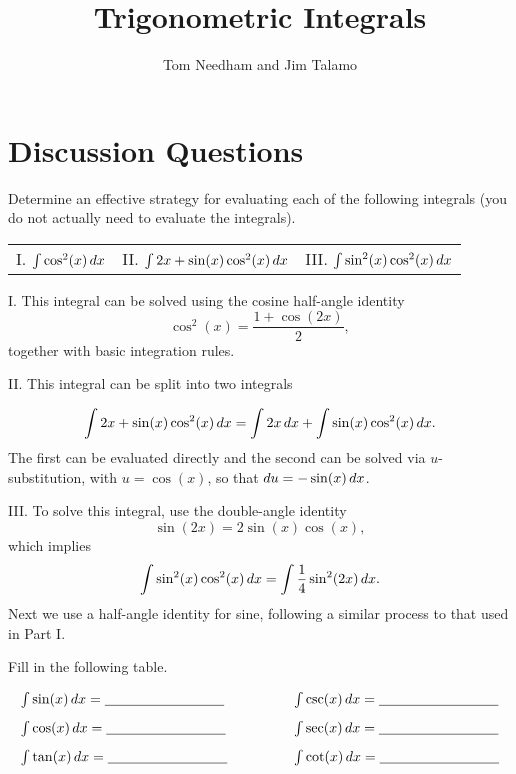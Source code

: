 \documentclass[noauthor]{ximera}
\author{Tom Needham and Jim Talamo}
\title[]{Trigonometric Integrals}
\begin{document}
\begin{abstract}
\end{abstract}
\maketitle


\section{Discussion Questions}

\begin{problem}
Determine an effective strategy for evaluating each of the following integrals (you do not actually need to evaluate the integrals).

\begin{center}
\begin{tabular}{lll}
I. $\int \cos^2(x) \mathop{}\!d x$ \hspace{.1in} & II. $\int 2x+\sin (x) \cos^2(x) \mathop{}\!d x$ \hspace{.1in} &  III. $\int \sin^2(x) \cos^2(x) \mathop{}\!d x$
\end{tabular}
\end{center}
\end{problem}

\begin{freeResponse}
I. This integral can be solved using the cosine half-angle identity 
$$
\cos^2(x) = \frac{1+\cos(2x)}{2},
$$
together with basic integration rules.

II. This integral can be split into two integrals

\[
\int 2x+\sin (x) \cos^2(x) \mathop{}\!d x = \int 2x \mathop{}\!d x +\int \sin (x) \cos^2(x) \mathop{}\!d x.
\]
The first can be evaluated directly and the second can be solved via $u$-substitution, with $u=\cos (x)$, so that $\mathop{}\!d u = -\sin (x) \mathop{}\!d x$.

III. To solve this integral, use the double-angle identity
$$
\sin (2x) = 2 \sin(x) \cos(x),
$$
which implies
$$
\int \sin^2(x) \cos^2(x) \mathop{}\!d x= \int \frac{1}{4} \sin^2(2x) \mathop{}\!d x.
$$
Next we use a half-angle identity for sine, following a similar process to that used in Part I.
\end{freeResponse}


\begin{problem}
Fill in the following table.

\[
\begin{array}{ll}
\int \sin(x) \d x = \underline{\hspace{30mm}} \qquad \qquad & \int \csc(x) \d x = \underline{\hspace{30mm}} \\ [2 ex]
\int \cos(x) \d x = \underline{\hspace{30mm}} \qquad & \int \sec(x) \d x = \underline{\hspace{30mm}} \\ [2 ex]
\int \tan(x) \d x = \underline{\hspace{30mm}} \qquad & \int \cot(x) \d x = \underline{\hspace{30mm}} \\ [2 ex]
\end{array}
\]

\end{problem}
\end{document}
